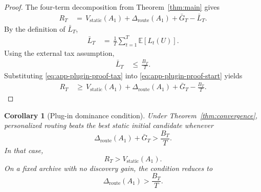 \documentclass{article} %
\newtheorem{corollary}[theorem]{Corollary}
\begin{document}
\begin{proof}
The four-term decomposition from Theorem~\ref{thm:main} gives
\begin{align}
\label{eq:app-plugin-proof-start}
R_T
&\,=\,
V_{\mathrm{static}}(A_1)
+
\Delta_{\mathrm{route}}(A_1)
+
\bar G_T
-
\bar L_T.
\end{align}
By the definition of \(\bar L_T\),
\begin{align}
\label{eq:app-plugin-proof-lbar}
\bar L_T
&\,=\,
\frac{1}{T}
\sum_{t=1}^{T}
\mathbb{E}[L_t(U)].
\end{align}
Using the external tax assumption,
\begin{align}
\label{eq:app-plugin-proof-tax}
\bar L_T
&\,\le\,
\frac{B_T}{T}.
\end{align}
Substituting \eqref{eq:app-plugin-proof-tax} into \eqref{eq:app-plugin-proof-start} yields
\begin{align}
\label{eq:app-plugin-proof-final}
R_T
&\,\ge\,
V_{\mathrm{static}}(A_1)
+
\Delta_{\mathrm{route}}(A_1)
+
\bar G_T
-
\frac{B_T}{T}.
\end{align}
\end{proof}

\begin{corollary}[Plug-in dominance condition]
\label{cor:app-plugin-dominance}
Under Theorem~\ref{thm:convergence}, personalized routing beats the best static initial candidate whenever
\begin{equation}
\label{eq:app-plugin-dominance-condition}
\Delta_{\mathrm{route}}(A_1)
+
\bar G_T
>
\frac{B_T}{T}.
\end{equation}
In that case,
\begin{equation}
\label{eq:app-plugin-dominance-result}
R_T
>
V_{\mathrm{static}}(A_1).
\end{equation}
On a fixed archive with no discovery gain, the condition reduces to
\begin{equation}
\label{eq:app-plugin-fixed-archive}
\Delta_{\mathrm{route}}(A_1)
>
\frac{B_T}{T}.
\end{equation}
\end{corollary}
\end{document}
